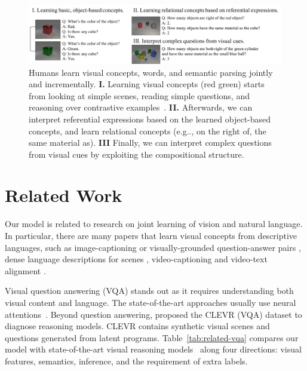 \documentclass{article} %
\makeatletter
\def\vs{{\bm{s}}}
\newcommand{\tbl}[1]{Table~\ref{#1}}
\DeclareRobustCommand\onedot{\futurelet\@let@token\@onedot}
\def\@onedot{\ifx\@let@token.\else.\null\fi\xspace}
\def\eg{e.g\onedot} \def\Eg{E.g\onedot}
\makeatother
\begin{document}
%
\begin{figure}[t]
\centering
%
\includegraphics[width=\textwidth]{raw/Teaser.pdf}
\caption{Humans learn visual concepts, words, and semantic parsing jointly and incrementally. {\bf I.} Learning visual concepts (red \vs green) starts from looking at simple scenes, reading simple questions, and reasoning over contrastive examples~\citep{fazly2010probabilistic}. {\bf II.} Afterwards, we can interpret referential expressions based on the learned object-based concepts, and learn relational concepts (\eg, on the right of, the same material as). {\bf III} Finally, we can interpret complex questions from visual cues by exploiting the compositional structure.}
\label{fig:teaser}
\vspace{-5pt}
\end{figure}
\section{Related Work}

Our model is related to research on joint learning of vision and natural language. In particular, there are many papers that learn visual concepts from descriptive languages, such as image-captioning or visually-grounded question-answer pairs \citep{kiros2014unifying,shi2018learning,mao2016training,vendrov2015order,ganju2017what}, dense language descriptions for scenes \citep{densecap}, video-captioning \citep{Donahue2015Long} and video-text alignment \citep{zhu2015aligning}.

Visual question answering (VQA) stands out as it requires understanding both visual content and language. The state-of-the-art approaches usually use neural attentions~\citep{malinowski2014multi,chen2015abc,Yang2016Stacked,xu2016ask}.  %
Beyond question answering, \cite{Johnson2017CLEVR} proposed the CLEVR (VQA) dataset to diagnose reasoning models. CLEVR contains synthetic visual scenes and questions generated from latent programs. \tbl{tab:related-vqa} compares our model with state-of-the-art visual reasoning models~\citep{Andreas2016Learning,Suarez2018DDRprog,Santoro2017simple} along four directions: visual features, semantics, inference, and the requirement of extra labels.
\end{document}
